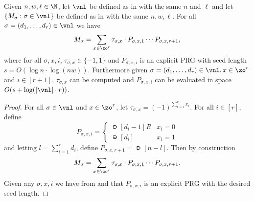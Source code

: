 \documentclass{toc}
\begin{document}
\begin{corollary}\label{cor:MstructPath}
Given $n,w,\ell \in \N$, let $\vnl$ be defined as in  with the same $n$ and $\ell$ and let $\{M_\sigma:\sigma\in\vnl\}$ be defined as in  with the same $n,w,\ell$. For all $\sigma=(d_1,\dots,d_r)\in \vnl$ we have
\[M_\sigma=\sum_{x\in \zo^r}\tau_{\sigma,x}\cdot P_{\sigma,x,1}\cdots P_{\sigma,x,r+1},\]
where for all $\sigma,x,i$, $\tau_{\sigma,x}\in \{-1,1\}$ and $P_{\sigma,x,i}$ is an explicit PRG with seed length $s=O(\log n\cdot\log (nw))$.
Furthermore given $\sigma=(d_1,\dots,d_r)\in \vnl,x\in \zo^r$ and $i\in [r+1]$, $\tau_{\sigma,x}$ can be computed and $P_{\sigma,x,i}$ can be evaluated in space $O(s+\log(|\vnl|\cdot r))$.
\end{corollary}
\begin{proof}
For all $\sigma\in \vnl$ and $x\in \zo^{r}$, let $\tau_{\sigma,x}=(-1)^{\sum_{i=1}^{r}x_i}$. For all $i\in[r]$, define
\[P_{\sigma,x,i} = \begin{cases}
\nis[d_{i}-1]R & x_i=0\\
\nis[d_{i}] & x_i=1
\end{cases}\]
and letting $l=\sum_{i=1}^rd_i$, define $P_{\sigma,x,r+1}=\nis[n-l]$. Then by construction
\[M_\sigma=\sum_{x\in \zo^r}\tau_{\sigma,x}\cdot P_{\sigma,x,1}\cdots P_{\sigma,x,r+1}.\] 
Given any $\sigma,x,i$ we have from  and  that $P_{\sigma,x,i}$ is an explicit PRG with the desired seed length.
\end{proof}
\end{document}
